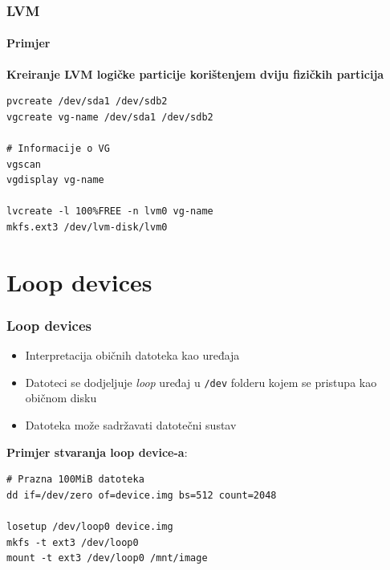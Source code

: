 \documentclass[t]{beamer}
\begin{document}
\begin{frame}[fragile]
	\frametitle{LVM}
	\framesubtitle{Primjer}
	\textbf{Kreiranje LVM logičke particije korištenjem dviju fizičkih particija}\\
	\begin{verbatim}
pvcreate /dev/sda1 /dev/sdb2
vgcreate vg-name /dev/sda1 /dev/sdb2

# Informacije o VG
vgscan
vgdisplay vg-name

lvcreate -l 100%FREE -n lvm0 vg-name
mkfs.ext3 /dev/lvm-disk/lvm0
	\end{verbatim}
\end{frame}

\section{Loop devices}
\begin{frame}[fragile]
	\frametitle{Loop devices}
	\begin{itemize}
		\item Interpretacija običnih datoteka kao uređaja
		\item Datoteci se dodjeljuje \emph{loop} uređaj u \texttt{/dev} folderu kojem se pristupa kao običnom disku
	\end{itemize}
	\begin{itemize}
		\item Datoteka može sadržavati datotečni sustav
	\end{itemize}
	\vfill
	\textbf{Primjer stvaranja loop device-a}:
	\begin{verbatim}
# Prazna 100MiB datoteka
dd if=/dev/zero of=device.img bs=512 count=2048

losetup /dev/loop0 device.img
mkfs -t ext3 /dev/loop0
mount -t ext3 /dev/loop0 /mnt/image
	\end{verbatim}
\end{frame}
\end{document}
